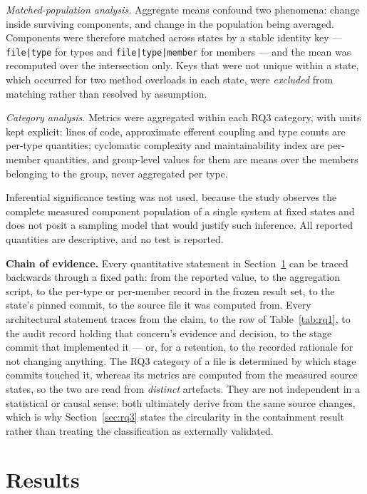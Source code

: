 \documentclass{sbc2019}%
\begin{document}
\emph{Matched-population analysis.} Aggregate means confound two phenomena:
change inside surviving components, and change in the population being averaged.
Components were therefore matched across states by a stable identity key ---
\texttt{file|type} for types and \texttt{file|type|member} for members --- and
the mean was recomputed over the intersection only. Keys that were not unique
within a state, which occurred for two method overloads in each state, were
\emph{excluded} from matching rather than resolved by assumption.

\emph{Category analysis.} Metrics were aggregated within each RQ3 category, with
units kept explicit: lines of code, approximate efferent coupling and type counts are
per-type quantities; cyclomatic complexity and maintainability index are
per-member quantities, and group-level values for them are means over the
members belonging to the group, never aggregated per type.

Inferential significance testing was not used, because the study observes the
complete measured component population of a single system at fixed states and
does not posit a sampling model that would justify such inference. All reported
quantities are descriptive, and no test is reported.

\medskip\noindent\textbf{Chain of evidence.} Every quantitative statement in
Section~\ref{sec:results} can be traced backwards through a fixed path: from the
reported value, to the aggregation script, to the per-type or per-member record
in the frozen result set, to the state's pinned commit, to the source file it was
computed from. Every architectural statement traces from the claim, to the row of
Table~\ref{tab:rq1}, to the audit record holding that concern's evidence and
decision, to the stage commit that implemented it --- or, for a retention, to the
recorded rationale for not changing anything. The RQ3 category of a file is
determined by which stage commits touched it, whereas its metrics are computed
from the measured source states, so the two are read from \emph{distinct}
artefacts. They are not independent in a statistical or causal sense: both
ultimately derive from the same source changes, which is why
Section~\ref{sec:rq3} states the circularity in the containment result rather
than treating the classification as externally validated.


\section{Results}\label{sec:results}
\end{document}
